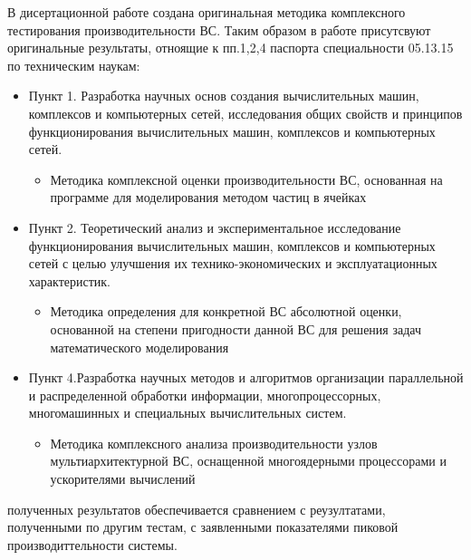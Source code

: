 {}
В дисертационной работе создана оригинальная методика комплексного тестирования производительности ВС. Таким образом в работе присутсвуют оригинальные результаты, отноящие к пп.1,2,4 паспорта специальности 05.13.15 по техническим наукам:
\begin{itemize}
	\item Пункт 1. Разработка научных основ создания вычислительных машин, комплексов и компьютерных сетей, исследования общих свойств и принципов функционирования вычислительных машин, комплексов и компьютерных сетей.
	\begin{itemize}
		
		\item Методика комплексной оценки производительности ВС, основанная на программе для моделирования методом частиц в ячейках
	\end{itemize}
	
	\item Пункт 2. Теоретический анализ и экспериментальное исследование функционирования вычислительных машин, комплексов и компьютерных сетей с целью улучшения их технико-экономических и эксплуатационных характеристик.
	\begin{itemize}
		
		\item Методика определения для конкретной ВС абсолютной оценки, основанной на степени пригодности данной ВС для решения задач математического моделирования
	\end{itemize}
	
	\item Пункт 4.Разработка научных методов и алгоритмов организации параллельной и распределенной обработки информации, многопроцессорных, многомашинных и специальных вычислительных систем.
	\begin{itemize}	
		\item Методика комплексного анализа производительности узлов мультиархитектурной ВС, оснащенной многоядерными процессорами и ускорителями вычислений
	\end{itemize}
	
	
\end{itemize}

{\reliability} полученных результатов обеспечивается сравнением с реузултатами, полученными по другим тестам, с заявленными показателями пиковой производиттельности системы.


{\probation}

